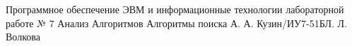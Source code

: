 \documentclass{bmstu}
\begin{document}

{Программное обеспечение ЭВМ и информационные технологии}
{лабораторной работе № 7}
{Анализ Алгоритмов}
{Алгоритмы поиска}
{}{А. А. Кузин/ИУ7-51Б}{Л. Л. Волкова}


\renewcommand{\contentsname}{Содержание}
\tableofcontents
\setcounter{page}{2}






\makebibliography
\end{document}
